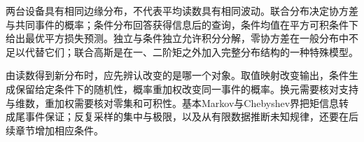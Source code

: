 两台设备具有相同边缘分布，不代表平均读数具有相同波动。联合分布决定协方差与共同事件的概率；条件分布回答获得信息后的查询，条件均值在平方可积条件下给出最优平方损失预测。独立与条件独立允许积分分解，零协方差在一般分布中不足以代替它们；联合高斯是在一、二阶矩之外加入完整分布结构的一种特殊模型。

由读数得到新分布时，应先辨认改变的是哪一个对象。取值映射改变输出，条件生成保留给定条件下的随机性，概率重加权改变同一事件的概率。换元需要核对支持与维数，重加权需要核对零集和可积性。基本Markov与Chebyshev界把矩信息转成尾事件保证；反复采样的集中与极限，以及从有限数据推断未知规律，还要在后续章节增加相应条件。

